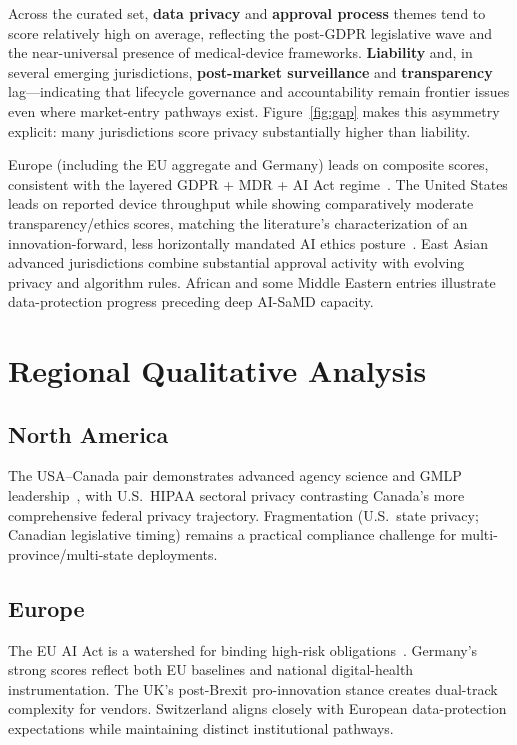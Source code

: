 Across the curated set, \textbf{data privacy} and \textbf{approval process} themes tend to score relatively high on average, reflecting the post-GDPR legislative wave and the near-universal presence of medical-device frameworks. \textbf{Liability} and, in several emerging jurisdictions, \textbf{post-market surveillance} and \textbf{transparency} lag---indicating that lifecycle governance and accountability remain frontier issues even where market-entry pathways exist. Figure~\ref{fig:gap} makes this asymmetry explicit: many jurisdictions score privacy substantially higher than liability.

Europe (including the EU aggregate and Germany) leads on composite scores, consistent with the layered GDPR + MDR + AI Act regime~\cite{euaiact2024}. The United States leads on reported device throughput while showing comparatively moderate transparency/ethics scores, matching the literature's characterization of an innovation-forward, less horizontally mandated AI ethics posture~\cite{fda2021,wu2021}. East Asian advanced jurisdictions combine substantial approval activity with evolving privacy and algorithm rules. African and some Middle Eastern entries illustrate data-protection progress preceding deep AI-SaMD capacity.


\section{Regional Qualitative Analysis}
\label{sec:regional}

\subsection{North America}
The USA--Canada pair demonstrates advanced agency science and GMLP leadership~\cite{gmlp2021}, with U.S.\ HIPAA sectoral privacy contrasting Canada's more comprehensive federal privacy trajectory. Fragmentation (U.S.\ state privacy; Canadian legislative timing) remains a practical compliance challenge for multi-province/multi-state deployments.

\subsection{Europe}
The EU AI Act is a watershed for binding high-risk obligations~\cite{euaiact2024}. Germany's strong scores reflect both EU baselines and national digital-health instrumentation. The UK's post-Brexit pro-innovation stance creates dual-track complexity for vendors. Switzerland aligns closely with European data-protection expectations while maintaining distinct institutional pathways.

